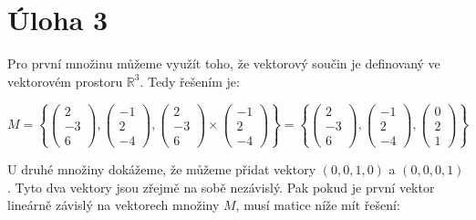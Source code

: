 \documentclass{fkssolpub}
\begin{document}
\section{Úloha 3}

Pro první množinu můžeme využít toho, že vektorový součin je definovaný ve vektorovém prostoru $\mathbb{R}^3$. Tedy řešením je:

\[
  M = \left\{
    \begin{pmatrix}
      2 \\ -3 \\ 6
    \end{pmatrix}
    ,
    \begin{pmatrix}
      -1 \\ 2 \\ -4
    \end{pmatrix}
    ,
    \begin{pmatrix}
      2 \\ -3 \\ 6
    \end{pmatrix} 
    \times
    \begin{pmatrix}
      -1 \\ 2 \\ -4
    \end{pmatrix}
    \right\} =
  \left\{
    \begin{pmatrix}
      2 \\ -3 \\ 6
    \end{pmatrix}
    ,
    \begin{pmatrix}
      -1 \\ 2 \\ -4
    \end{pmatrix}
    ,
    \begin{pmatrix}
      0 \\ 2 \\ 1
    \end{pmatrix} 
    \right\}
\]

U druhé množiny dokážeme, že můžeme přidat vektory $(0,0,1,0)$ a $(0,0,0,1)$. Tyto dva vektory jsou zřejmě na sobě nezávislý. Pak pokud je první vektor lineárně závislý na vektorech množiny $M$, musí matice níže mít řešení:
\end{document}
